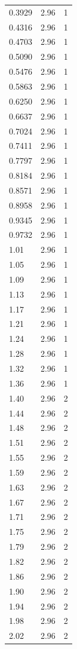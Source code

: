 \begin{longtable}{lrr}
  0.3929 & 2.96 & 1 \\
  0.4316 & 2.96 & 1 \\
  0.4703 & 2.96 & 1 \\
  0.5090 & 2.96 & 1 \\
  0.5476 & 2.96 & 1 \\
  0.5863 & 2.96 & 1 \\
  0.6250 & 2.96 & 1 \\
  0.6637 & 2.96 & 1 \\
  0.7024 & 2.96 & 1 \\
  0.7411 & 2.96 & 1 \\
  0.7797 & 2.96 & 1 \\
  0.8184 & 2.96 & 1 \\
  0.8571 & 2.96 & 1 \\
  0.8958 & 2.96 & 1 \\
  0.9345 & 2.96 & 1 \\
  0.9732 & 2.96 & 1 \\
  1.01 & 2.96 & 1 \\
  1.05 & 2.96 & 1 \\
  1.09 & 2.96 & 1 \\
  1.13 & 2.96 & 1 \\
  1.17 & 2.96 & 1 \\
  1.21 & 2.96 & 1 \\
  1.24 & 2.96 & 1 \\
  1.28 & 2.96 & 1 \\
  1.32 & 2.96 & 1 \\
  1.36 & 2.96 & 1 \\
  1.40 & 2.96 & 2 \\
  1.44 & 2.96 & 2 \\
  1.48 & 2.96 & 2 \\
  1.51 & 2.96 & 2 \\
  1.55 & 2.96 & 2 \\
  1.59 & 2.96 & 2 \\
  1.63 & 2.96 & 2 \\
  1.67 & 2.96 & 2 \\
  1.71 & 2.96 & 2 \\
  1.75 & 2.96 & 2 \\
  1.79 & 2.96 & 2 \\
  1.82 & 2.96 & 2 \\
  1.86 & 2.96 & 2 \\
  1.90 & 2.96 & 2 \\
  1.94 & 2.96 & 2 \\
  1.98 & 2.96 & 2 \\
  2.02 & 2.96 & 2 \\

\end{longtable}
